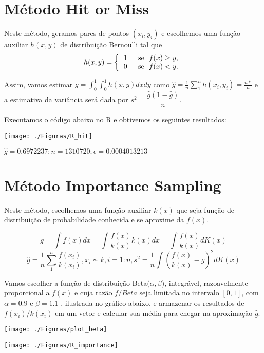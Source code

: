 \documentclass{article}
\begin{document}
\section{Método Hit or Miss}

Neste método, geramos pares de pontos $(x_i,y_i)$ e escolhemos uma função auxiliar $h(x,y)$ de distribuição Bernoulli tal que 
\[
  h(x,y)= \left\{
    \begin{tabular}[]{cc}
     1 & \text{ se } $f(x) \geq y$,\\
     0 & \text{ se } $f(x) < y$.
    \end{tabular}
    \right.
  \]
  
  
  Assim, vamos estimar $g=\int_{0}^{1}\int_{0}^{1}h(x,y)dxdy$ como $\hat{g}=\frac{1}{n}\sum_{1}^{n}h(x_i,y_i)=\frac{n*}{n}$ e a estimativa da variância será dada por $s^2 = \dfrac{\hat{g}(1-\hat{g})}{n}$.
  
  
  Executamos o código abaixo no R e obtivemos os seguintes resultados:\\
\begin{center}
  \texttt{[image: ./Figuras/R\_hit]}\\
\end{center}  

 $\hat{g} = 0.6972237; n = 1310720;    \epsilon = 0.0004013213$

\section{Método Importance Sampling}



Neste método, escolhemos uma função auxiliar $k(x)$ que seja função de distribuição de probabilidade conhecida e se aproxime da $f(x)$.

$$
g = \int f(x)dx = \int\frac{f(x)}{k(x)} k(x)dx = \int \frac{f(x)}{k(x)}dK(x)
$$
$$
\hat{g} = \frac{1}{n}\sum_{1}^{n}\frac{f(x_i)}{k(x_i)}, x_i \sim k, i =1:n,s^2 = \frac{1}{n}\int\left(\frac{f(x)}{k(x)} - \hat{g}\right)^2dK(x)
$$


Vamos escolher a função de distribuição Beta($\alpha,\beta$), integrável, razoavelmente proporcional a $f(x)$ e cuja razão $f/Beta$ seja limitada no intervalo $[0,1]$, com $\alpha = 0.9$ e $\beta=1.1$ , ilustrada no gráfico abaixo, e armazenar os resultados de $f(x_i)/k(x_i)$ em um vetor e calcular sua média para chegar na aproximação $\hat{g}$.
\begin{center}
  \texttt{[image: ./Figuras/plot\_beta]}\\
\end{center}  
\begin{center}
  \texttt{[image: ./Figuras/R\_importance]}\\
\end{center} 
\end{document}
